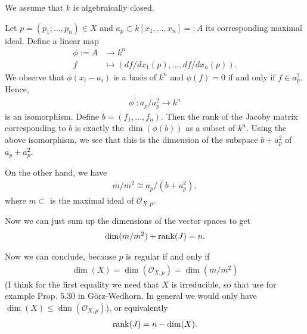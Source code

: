 \newcommand{\sheet}{12}




\maketitle{}

\begin{exercise}{2}
    We assume that $k$ is algebraically closed.

    
    Let $p=(p_1;\dots,p_n)\in X$ and $a_p\subset k[x_1,\dots,x_n]=:A$ its corresponding maximal ideal. Define a linear map
    \begin{align*}
        \phi := A &\to k^n\\
        f&\mapsto ({df}/{dx_1}(p),\dots, {df}/{dx_n}(p)).
    \end{align*}
    We observe that $\phi(x_i-a_i)$ is a basis of $k^n$ and $\phi(f)=0$ if and only if $f\in a_p^2$. Hence,
    \begin{align*}
        \phi^\prime:a_p/a_p^2 \to k^n
    \end{align*}
    is an isomorphism. Define $b=(f_1,\dots, f_n).$ Then the rank of the Jacoby matrix corresponding to $b$
    is exactly the $\dim(\phi(b))$ as a subset of $k^n$. Using the above isomorphism, we see that this is the dimension
    of the subspace $b+a_p^2$ of $a_p+a_p^2$.

    On the other hand, we have 
    \begin{align*}
        m/m^2\cong a_p/(b+a_p^2),
    \end{align*}
    where $m\subset$ is the maximal ideal of $\mathcal{O}_{X,p}.$ 

    Now we can just sum up the dimensions of the vector spaces to get
    \begin{align*}
        \dim(m/m^2)+\operatorname{rank}(J)=n.
    \end{align*}

    Now we can conclude, because $p$ is regular if and only if 
    \begin{align*}
        \dim(X)=\dim(\mathcal{O}_{X,p})=\dim(m/m^2)
    \end{align*}
     (I think for the first 
    equality we need that $X$ is irreducible, so that use for example Prop. 5.30 in Görz-Wedhorn. In general
    we would only have $\dim(X)\leq\dim(\mathcal{O}_{X,p})$),
     or equivalently
    \begin{align*}
        \operatorname{rank}(J)=n-\dim(X).
    \end{align*}
\end{exercise}


